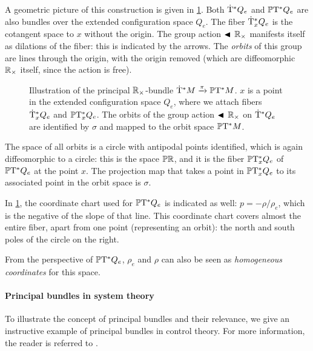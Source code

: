 A geometric picture of this construction is given in \cref{fig:principal_bundle}. Both \(\mathrm{\dot{T}}^*Q_e\) and \(\mathbb{P}\mathrm{T}^* Q_e\) are also bundles over the extended configuration space \(Q_e\). 
The fiber \(\mathrm{\dot{T}}^*_{x} Q_e\) is the cotangent space to \(x\) without the origin. 
The group action \(\blacktriangleleft\,\mathbb{R}_{\times}\) manifests itself as dilations of the fiber: this is indicated by the arrows. The \emph{orbits} of this group are lines through the origin, with the origin removed (which are diffeomorphic \(\mathbb{R}_{\times}\) itself, since the action is free). 
\begin{figure}[ht!]
    \centering
    
    \caption{Illustration of the principal \(\mathbb{R}_{\times}\)-bundle \(\mathrm{\dot{T}}^*M\xrightarrow[]{\pi}\mathbb{P}\mathrm{T}^* M\). \(x\) is a point in the extended configuration space \(Q_e\), where we attach fibers \(\mathrm{\dot{T}}^*_{x} Q_e\) and \(\mathbb{P}\mathrm{T}^*_{x} Q_e\). The orbits of the group action \(\blacktriangleleft\,\mathbb{R}_{\times}\) on \(\mathrm{\dot{T}}^*Q_e\) are identified by \(\sigma\) and mapped to the orbit space \(\mathbb{P}\mathrm{T}^* M\). }
    \label{fig:principal_bundle}
\end{figure}

The space of all orbits is a circle with antipodal points identified, which is again diffeomorphic to a circle: this is the space \(\mathbb{P}\mathbb{R}\), and it is the fiber \(\mathbb{P}\mathrm{T}^*_{x} Q_e\) of \(\mathbb{P}\mathrm{T}^* Q_e\) at the point \(x\). The projection map that takes a point in \(\mathbb{P}\mathrm{T}^*_{x} Q_e\) to its associated point in the orbit space is \(\sigma\). 

In \cref{fig:principal_bundle}, the coordinate chart used for \(\mathbb{P}\mathrm{T}^* Q_e\) is indicated as well: \(p = -\rho/\rho_e\), which is the negative of the slope of that line. This coordinate chart covers almost the entire fiber, apart from one point (representing an orbit): the north and south poles of the circle on the right.

From the perspective of \(\mathbb{P}\mathrm{T}^* Q_e\), \(\rho_e\) and \(\rho\) can also be seen as \emph{homogeneous coordinates} for this space.

\paragraph{Principal bundles in system theory}
To illustrate the concept of principal bundles and their relevance, we give an instructive example of principal bundles in control theory. For more information, the reader is referred to \citet{Hermann1984}. 

